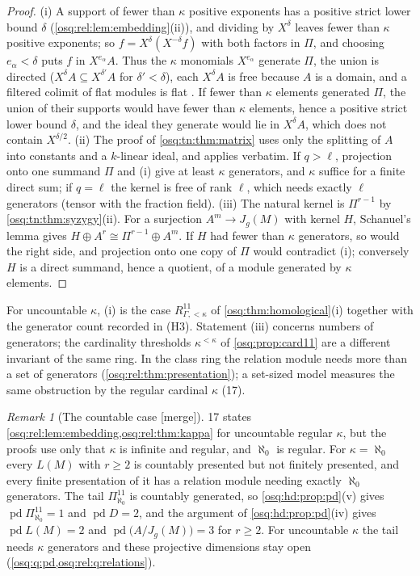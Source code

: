 \documentclass[11pt,letterpaper]{article}
\numberwithin{equation}{section}
\theoremstyle{definition}
\theoremstyle{remark}
\newtheorem{remark}[remark]{Remark}
\theoremstyle{plain}
\newcommand{\pd}{\operatorname{pd}}
\newcommand{\merge}{\textup{\textsf{[merge]}}}
\begin{document}
\begin{proof}
(i) A support of fewer than $\kappa$ positive exponents has a positive strict lower bound $\delta$
(\cref{osq:rel:lem:embedding}(ii)), and dividing by $X^\delta$ leaves fewer than $\kappa$ positive exponents; so
$f=X^\delta(X^{-\delta}f)$ with both factors in $\Pi$, and choosing $e_\alpha<\delta$ puts $f$ in $X^{e_\alpha}A$. Thus the $\kappa$
monomials $X^{e_\alpha}$ generate $\Pi$, the union is directed ($X^\delta A\subseteq X^{\delta'}A$ for $\delta'<\delta$), each
$X^\delta A$ is free because $A$ is a domain, and a filtered colimit of flat modules is flat \cite[Lemma~10.39.3]{StacksFlat}. If
fewer than $\kappa$ elements generated $\Pi$, the union of their supports would have fewer than $\kappa$ elements, hence a positive
strict lower bound $\delta$, and the ideal they generate would lie in $X^\delta A$, which does not contain $X^{\delta/2}$.
(ii) The proof of \cref{osq:tn:thm:matrix} uses only the splitting of $A$ into constants and a $k$-linear ideal, and applies
verbatim. If $q>\ell$, projection onto one summand $\Pi$ and (i) give at least $\kappa$ generators, and $\kappa$ suffice for a
finite direct sum; if $q=\ell$ the kernel is free of rank $\ell$, which needs exactly $\ell$ generators (tensor with the fraction
field). (iii) The natural kernel is $\Pi^{r-1}$ by \cref{osq:tn:thm:syzygy}(ii). For a surjection $A^m\to J_g(M)$ with kernel $H$,
Schanuel's lemma gives $H\oplus A^r\cong\Pi^{r-1}\oplus A^m$. If $H$ had fewer than $\kappa$ generators, so would the right side,
and projection onto one copy of $\Pi$ would contradict (i); conversely $H$ is a direct summand, hence a quotient, of a module
generated by $\kappa$ elements.
\end{proof}

For uncountable $\kappa$, (i) is the case $R^{11}_{\Gamma,<\kappa}$ of \cref{osq:thm:homological}(i) together with the generator count
recorded in (H3). Statement (iii) concerns numbers of generators; the cardinality thresholds $\kappa^{<\kappa}$ of
\cref{osq:prop:card11} are a different invariant of the same ring. In the class ring the relation module needs more than a set of
generators (\cref{osq:rel:thm:presentation}); a set-sized model measures the same obstruction by the regular cardinal $\kappa$ (17).

\begin{remark}[The countable case \merge]\label{osq:rel:rem:alephzero}
17 states \cref{osq:rel:lem:embedding,osq:rel:thm:kappa} for uncountable regular $\kappa$, but the proofs use only that $\kappa$ is
infinite and regular, and $\aleph_0$ is regular. For $\kappa=\aleph_0$ every $L(M)$ with $r\ge2$ is countably presented but not
finitely presented, and every finite presentation of it has a relation module needing exactly $\aleph_0$ generators. The tail
$\Pi^{11}_{\aleph_0}$ is countably generated, so \cref{osq:hd:prop:pd}(v) gives $\pd\Pi^{11}_{\aleph_0}=1$ and $\pd D=2$, and the
argument of \cref{osq:hd:prop:pd}(iv) gives $\pd L(M)=2$ and $\pd\bigl(A/J_g(M)\bigr)=3$ for $r\ge2$. For uncountable $\kappa$ the tail
needs $\kappa$ generators and these projective dimensions stay open (\cref{osq:q:pd,osq:rel:q:relations}).
\end{remark}
\end{document}
